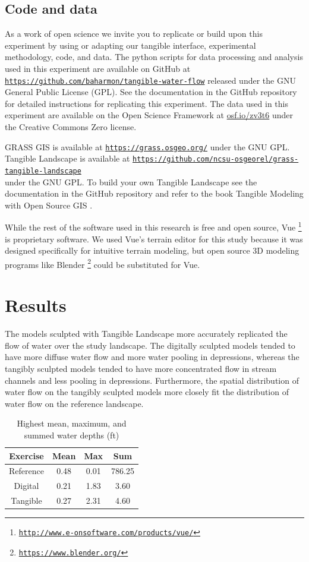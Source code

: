 \documentclass{isprs}
\newcommand{\urlhttp}[1]{\href{http://#1}{\nolinkurl{#1}}}
\newcommand{\urlhttps}[1]{\href{https://#1}{\nolinkurl{#1}}}
\begin{document}
\subsection{Code and data}

As a work of open science we invite you to
replicate or build upon this experiment by 
using or adapting our tangible interface, experimental methodology, code, and data. 
%
The python scripts for data processing and analysis used in this experiment 
are available on GitHub at 
\urlhttps{https://github.com/baharmon/tangible-water-flow}
released under the GNU General Public License (GPL). 
%
See the documentation in the GitHub repository for detailed instructions for replicating this experiment. 
%
The data used in this experiment are available on the Open Science Framework at \url{osf.io/zv3t6} under the Creative Commons Zero license.

GRASS GIS is available at
\urlhttps{https://grass.osgeo.org/} 
under the GNU GPL. 
%
Tangible Landscape is available at
\urlhttps{https://github.com/ncsu-osgeorel/grass-tangible-landscape} \\
under the GNU GPL. 
%
To build your own Tangible Landscape
see the documentation in the GitHub repository 
and refer to the book Tangible Modeling with Open Source GIS \cite{Petrasova2015}.

While the rest of the software used in this research is free and open source, 
Vue \footnote{\urlhttp{http://www.e-onsoftware.com/products/vue/}} is proprietary software. 
We used Vue's terrain editor for this study because it was designed specifically for intuitive terrain modeling, but 
open source 3D modeling programs like Blender \footnote{\urlhttps{https://www.blender.org/}} could be substituted for Vue. 
%

\section{Results}\label{sec:results}
%
The models sculpted with Tangible Landscape more accurately replicated the flow of water over the study landscape. 
%
The digitally sculpted models tended to have 
more diffuse water flow
and more water pooling in depressions, whereas 
%
the tangibly sculpted models tended to have 
more concentrated flow in stream channels
and less pooling in depressions.
%
Furthermore, 
the spatial distribution of water flow on the tangibly sculpted models 
more closely fit the distribution of water flow on the reference landscape. 

\begin{table}[h!]
\centering
\begin{tabular}{c c c c}
\toprule
Exercise & Mean & Max & Sum\\
\midrule
Reference & 0.48 & 0.01 & 786.25\\
Digital & 0.21 & 1.83 & 3.60\\
Tangible & 0.27 & 2.31 & 4.60\\ 
\bottomrule
\end{tabular}
\vspace*{0.5em}
\caption{Highest mean, maximum, and summed water depths (ft)}
\label{table:water_depth} 
\end{table}
\end{document}
